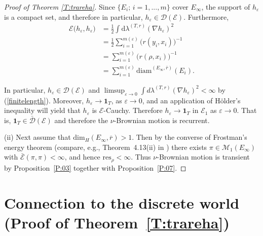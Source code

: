 \documentclass[11pt]{amsart}
\numberwithin{equation}{section}
\begin{document}
{\begin{proof}[Proof of Theorem \ref{T:trareha}]
Since $\{E_{i};\,i=1,...,m\}$ cover $E_{\infty}$,  the  support of $h_{\varepsilon}$ is a compact set, and therefore in particular, $h_{\varepsilon}\in{\mathcal D}({\mathcal E})$.  Furthermore,
\begin{equation}
\label{e:intnabla1}
\begin{aligned}
 {\mathcal E}\big(h_\varepsilon,h_\varepsilon\big)
 &=
   \tfrac{1}{2}\int\mathrm{d}\lambda^{(T,r)}(\nabla h_\varepsilon)^2
  \\
 &=
    \tfrac{1}{2}\sum\nolimits_{i=1}^{m(\varepsilon)}\big(r(y_{i},x_i)\big)^{-1}
  \\
 &=
    \sum\nolimits_{i=1}^{m(\varepsilon)}\big(r(\rho,x_i)\big)^{-1}
  \\
 &=
    \sum\nolimits_{i=1}^{m(\varepsilon)}\mathrm{diam}^{(E_\infty,\bar{r})}(E_i).
\end{aligned}
\end{equation}

In particular, $h_\varepsilon\in{\mathcal D}({\mathcal E})$ and  $\limsup_{\varepsilon\to 0}\int d\lambda^{(T,r)}(\nabla h_\varepsilon)^2<\infty$ by (\ref{finitelength}).
Moreover, $h_\varepsilon\to\mathbf{1}_T$, as $\varepsilon\to 0$, and an application of H\"older's inequality will yield that  $h_\varepsilon$ is ${\mathcal E}$-Cauchy.  Therefore $h_\varepsilon\to\mathbf{1}_T$ in ${\mathcal E}_1$ as $\varepsilon\to 0$.
That is, $\mathbf{1}_T\in\bar{\mathcal D}({\mathcal E})$ and therefore the $\nu$-Brownian motion is recurrent.  {\smallskip}

(ii) Next assume that $\mathrm{dim}_H(E_\infty,\overline r)>1$. Then by the converse of Frostman's energy theorem (compare, e.g., Theorem~4.13(ii) in \cite{Fal2003}) there exists $\pi \in{\mathcal M}_1(E_\infty)$ with $\bar{\mathcal E}(\pi,\pi)<\infty$, and hence $\mathrm{res}_\rho<\infty$. Thus $\nu$-Brownian motion is transient by Proposition~\ref{P:03} together with Proposition~\ref{P:07}.
 \end{proof}{\smallskip}

\section{Connection to the discrete world (Proof of Theorem~\ref{T:trareha})}
\label{Sub:contdisc}

}
\end{document}
